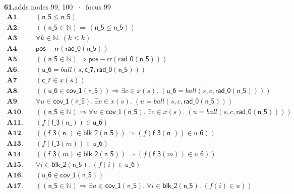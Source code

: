 \documentclass[11pt]{article}
\newcommand{\fit}[1]{\resizebox{\ifdim\width>\linewidth\linewidth\else\width\fi}{!}{#1}}
\begin{document}
\medskip\noindent\textbf{61.}\quad \fit{\texttt{(di)}}\hfill{\small adds nodes 99, 100 $\;\cdot\;$ focus 99}\\[2pt]
\begin{align*}
  \mathbf{A1.}\quad & (\mathsf{n\_5} \leq \mathsf{n\_5}) \\
  \mathbf{A2.}\quad & ((\mathsf{n\_5} \in \mathbb{N}) \Rightarrow (\mathsf{n\_5} \leq \mathsf{n\_5})) \\
  \mathbf{A3.}\quad & \forall k \in \mathbb{N}.\; (k \leq k) \\
  \mathbf{A4.}\quad & \mathsf{pos{-}rr}(\mathsf{rad\_0}(\mathsf{n\_5})) \\
  \mathbf{A5.}\quad & ((\mathsf{n\_5} \in \mathbb{N}) \Rightarrow \mathsf{pos{-}rr}(\mathsf{rad\_0}(\mathsf{n\_5}))) \\
  \mathbf{A6.}\quad & (\mathsf{u\_6} = \mathit{ball}(s, \mathsf{c\_7}, \mathsf{rad\_0}(\mathsf{n\_5}))) \\
  \mathbf{A7.}\quad & (\mathsf{c\_7} \in x(s)) \\
  \mathbf{A8.}\quad & ((\mathsf{u\_6} \in \mathsf{cov\_1}(\mathsf{n\_5})) \Rightarrow \exists c \in x(s).\; (\mathsf{u\_6} = \mathit{ball}(s, c, \mathsf{rad\_0}(\mathsf{n\_5})))) \\
  \mathbf{A9.}\quad & \forall u \in \mathsf{cov\_1}(\mathsf{n\_5}).\; \exists c \in x(s).\; (u = \mathit{ball}(s, c, \mathsf{rad\_0}(\mathsf{n\_5}))) \\
  \mathbf{A10.}\quad & ((\mathsf{n\_5} \in \mathbb{N}) \Rightarrow \forall u \in \mathsf{cov\_1}(\mathsf{n\_5}).\; \exists c \in x(s).\; (u = \mathit{ball}(s, c, \mathsf{rad\_0}(\mathsf{n\_5})))) \\
  \mathbf{A11.}\quad & (f(\mathsf{f\_3}(\mathsf{n\_})) \in \mathsf{u\_6}) \\
  \mathbf{A12.}\quad & ((\mathsf{f\_3}(\mathsf{n\_}) \in \mathsf{blk\_2}(\mathsf{n\_5})) \Rightarrow (f(\mathsf{f\_3}(\mathsf{n\_})) \in \mathsf{u\_6})) \\
  \mathbf{A13.}\quad & (f(\mathsf{f\_3}(m)) \in \mathsf{u\_6}) \\
  \mathbf{A14.}\quad & ((\mathsf{f\_3}(m) \in \mathsf{blk\_2}(\mathsf{n\_5})) \Rightarrow (f(\mathsf{f\_3}(m)) \in \mathsf{u\_6})) \\
  \mathbf{A15.}\quad & \forall i \in \mathsf{blk\_2}(\mathsf{n\_5}).\; (f(i) \in \mathsf{u\_6}) \\
  \mathbf{A16.}\quad & (\mathsf{u\_6} \in \mathsf{cov\_1}(\mathsf{n\_5})) \\
  \mathbf{A17.}\quad & ((\mathsf{n\_5} \in \mathbb{N}) \Rightarrow \exists u \in \mathsf{cov\_1}(\mathsf{n\_5}).\; \forall i \in \mathsf{blk\_2}(\mathsf{n\_5}).\; (f(i) \in u)) \\

\end{align*}
\end{document}
